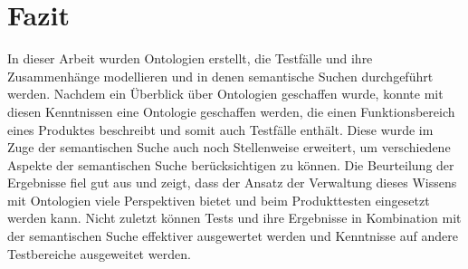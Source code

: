 \chapter{Fazit}
In dieser Arbeit wurden Ontologien erstellt, die Testfälle und ihre Zusammenhänge modellieren und in denen semantische Suchen durchgeführt werden. Nachdem ein Überblick über Ontologien geschaffen wurde, konnte mit diesen Kenntnissen eine Ontologie geschaffen werden, die einen Funktionsbereich eines Produktes beschreibt und somit auch Testfälle enthält. Diese wurde im Zuge der semantischen Suche auch noch Stellenweise erweitert, um verschiedene Aspekte der semantischen Suche berücksichtigen zu können. Die Beurteilung der Ergebnisse fiel gut aus und zeigt, dass der Ansatz der Verwaltung dieses Wissens mit Ontologien viele Perspektiven bietet und beim Produkttesten eingesetzt werden kann. Nicht zuletzt können Tests und ihre Ergebnisse in Kombination mit der semantischen Suche effektiver ausgewertet werden und Kenntnisse auf andere Testbereiche ausgeweitet werden.